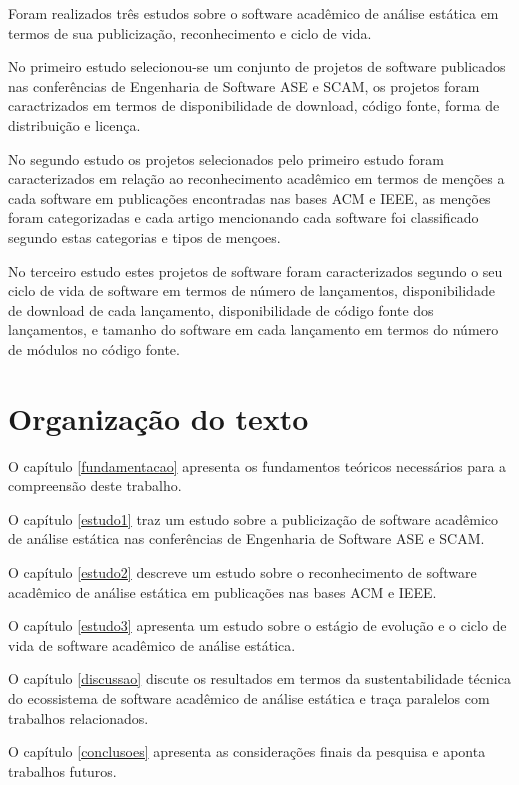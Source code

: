 Foram realizados três estudos sobre o software acadêmico de análise estática em
termos de sua publicização, reconhecimento e ciclo de vida.

No primeiro estudo selecionou-se um conjunto de projetos de software publicados
nas conferências de Engenharia de Software ASE e SCAM, os projetos foram
caractrizados em termos de disponibilidade de download, código fonte, forma de
distribuição e licença.

No segundo estudo os projetos selecionados pelo primeiro estudo foram
caracterizados em relação ao reconhecimento acadêmico em termos de menções a
cada software em publicações encontradas nas bases ACM e IEEE, as menções foram
categorizadas e cada artigo mencionando cada software foi classificado segundo
estas categorias e tipos de mençoes.

No terceiro estudo estes projetos de software foram caracterizados segundo o
seu ciclo de vida de software em termos de número de lançamentos,
disponibilidade de download de cada lançamento, disponibilidade de código fonte
dos lançamentos, e tamanho do software em cada lançamento em termos do número
de módulos no código fonte.

\section{Organização do texto}

O capítulo \ref{fundamentacao} apresenta os fundamentos teóricos necessários
para a compreensão deste trabalho.

O capítulo \ref{estudo1} traz um estudo sobre a publicização de software
acadêmico de análise estática nas conferências de Engenharia de Software ASE e
SCAM.

O capítulo \ref{estudo2} descreve um estudo sobre o reconhecimento de software
acadêmico de análise estática em publicações nas bases ACM e IEEE.

O capítulo \ref{estudo3} apresenta um estudo sobre o estágio de evolução e o
ciclo de vida de software acadêmico de análise estática.

O capítulo \ref{discussao} discute os resultados em termos da sustentabilidade
técnica do ecossistema de software acadêmico de análise estática e traça
paralelos com trabalhos relacionados.

O capítulo \ref{conclusoes} apresenta as considerações finais da pesquisa e
aponta trabalhos futuros.
